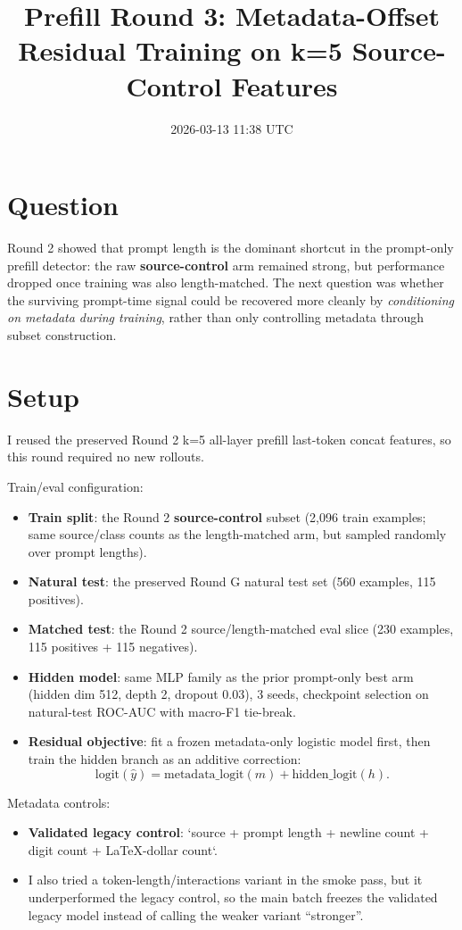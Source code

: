 \documentclass[11pt]{article}
\title{Prefill Round 3: Metadata-Offset Residual Training on k=5 Source-Control Features}
\author{}
\date{2026-03-13 11:38 UTC}
\begin{document}
\maketitle

\section*{Question}
Round 2 showed that prompt length is the dominant shortcut in the prompt-only prefill detector: the raw \textbf{source-control} arm remained strong, but performance dropped once training was also length-matched. The next question was whether the surviving prompt-time signal could be recovered more cleanly by \emph{conditioning on metadata during training}, rather than only controlling metadata through subset construction.

\section*{Setup}
I reused the preserved Round 2 k=5 all-layer prefill last-token concat features, so this round required no new rollouts.

Train/eval configuration:
\begin{itemize}
  \item \textbf{Train split}: the Round 2 \textbf{source-control} subset (2{,}096 train examples; same source/class counts as the length-matched arm, but sampled randomly over prompt lengths).
  \item \textbf{Natural test}: the preserved Round G natural test set (560 examples, 115 positives).
  \item \textbf{Matched test}: the Round 2 source/length-matched eval slice (230 examples, 115 positives + 115 negatives).
  \item \textbf{Hidden model}: same MLP family as the prior prompt-only best arm (hidden dim 512, depth 2, dropout 0.03), 3 seeds, checkpoint selection on natural-test ROC-AUC with macro-F1 tie-break.
  \item \textbf{Residual objective}: fit a frozen metadata-only logistic model first, then train the hidden branch as an additive correction:
  \[
    \text{logit}(\hat y) = \text{metadata\_logit}(m) + \text{hidden\_logit}(h).
  \]
\end{itemize}

Metadata controls:
\begin{itemize}
  \item \textbf{Validated legacy control}: `source + prompt length + newline count + digit count + LaTeX-dollar count`.
  \item I also tried a token-length/interactions variant in the smoke pass, but it underperformed the legacy control, so the main batch freezes the validated legacy model instead of calling the weaker variant ``stronger''.
\end{itemize}
\end{document}
